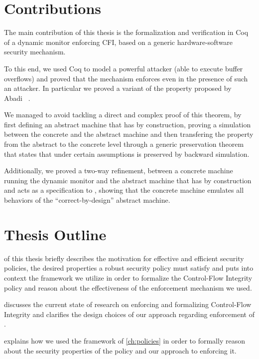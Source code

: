 \section{Contributions}\label{sec:contributions}

The main contribution of this thesis is the formalization and
verification in Coq of a dynamic monitor enforcing CFI, based on a
generic hardware-software security mechanism.

To this end, we used Coq to model a powerful attacker (\IE able to
execute buffer overflows) and proved that the mechanism enforces
\CFI even in the presence of such an attacker. In particular
we proved a variant of the \CFI property proposed by Abadi~\ETAL
\cite{AbadiBEL09}.

We managed to avoid tackling a direct and complex proof of this
theorem, by first defining an abstract machine that has \CFI by
construction, proving a simulation between the concrete and the
abstract machine and then transfering the \CFI property from the
abstract to the concrete level through a generic preservation theorem
that states that under certain assumptions \CFI is preserved by
backward simulation.

Additionally, we proved a two-way refinement, between a concrete
machine running the \CFI dynamic monitor and the abstract machine that
has \CFI by construction and acts as a specification to \CFI, showing
that the concrete machine emulates all behaviors of the
``correct-by-design'' abstract machine.


\section{Thesis Outline}\label{sec:outline}
 of this thesis briefly describes the motivation for
effective and efficient security policies, the desired properties a
robust security policy must satisfy and puts into context the
framework we utilize in order to formalize the Control-Flow Integrity policy
and reason about the effectiveness of the enforcement mechanism we used.

 discusses the current state of
research on enforcing and formalizing Control-Flow Integrity and clarifies
the design choices of our approach regarding enforcement of \CFI.

 explains how we used the framework of \cref{ch:policies}
in order to formally reason about the security properties of the \CFI policy and
our approach to enforcing it.

